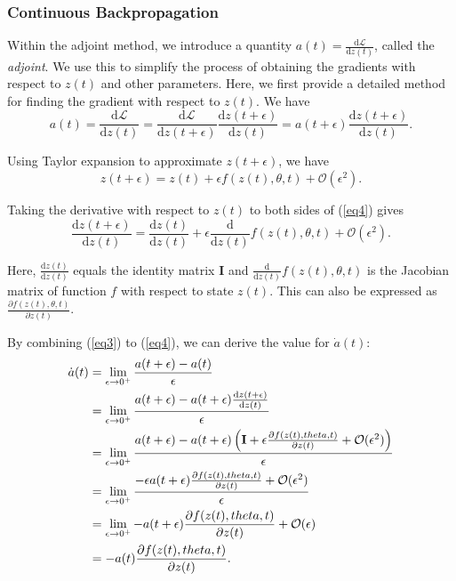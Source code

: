 \documentclass[a4paper,11pt,titlepage]{article}
\theoremstyle{definition}
\theoremstyle{plain}
\theoremstyle{remark}
\begin{document}
\subsubsection{Continuous Backpropagation}
\label{sec:contback}

Within the adjoint method, we introduce a quantity $a(t) = \frac{\mathrm{d} \mathcal{L}}{\mathrm{d} z(t)}$, called the \textit{adjoint}. We use this to simplify the process of obtaining the gradients with respect to $z(t)$ and other parameters. Here, we first provide a detailed method for finding the gradient with respect to $z(t)$. We have
\begin{equation}\label{eq3}
    a(t) = \frac{\mathrm{d} \mathcal{L}}{\mathrm{d} z(t)} = \frac{\mathrm{d} \mathcal{L}}{\mathrm{d} z(t+\epsilon)}\frac{\mathrm{d} z(t+\epsilon)}{\mathrm{d} z(t)}=a(t+\epsilon)\frac{\mathrm{d} z(t+\epsilon)}{\mathrm{d} z(t)}. \tag{3}
\end{equation}

Using Taylor expansion to approximate $z(t+\epsilon)$, we have
\begin{equation}\label{eq4}
z(t+\epsilon) = z(t)+\epsilon f(z(t),\theta,t) +\mathcal{O}(\epsilon^2). \tag{4}
\end{equation}

Taking the derivative with respect to $z(t)$ to both sides of (\ref{eq4}) gives
$$
\frac{\mathrm{d}z(t+\epsilon)}{\mathrm{d}z(t)} = \frac{\mathrm{d}z(t)}{\mathrm{d}z(t)}+\epsilon\frac{\mathrm{d}}{\mathrm{d}z(t)}f(z(t),\theta,t)+\mathcal{O}(\epsilon^2).
$$

Here, $\frac{\mathrm{d}z(t)}{\mathrm{d}z(t)}$ equals the identity matrix $\mathbf{I}$ and $\frac{\mathrm{d}}{\mathrm{d}z(t)}f(z(t),\theta,t)$ is the Jacobian matrix of function $f$ with respect to state $z(t)$. This can also be expressed as $\frac{\partial f(z(t),\theta,t)}{\partial z(t)}$.

By combining (\ref{eq3}) to (\ref{eq4}), we can derive the value for $\dot{a}(t)$:
\begin{align}
\dot{a}(t) &= \lim_{\epsilon \to 0^{+}}\frac{a(t+\epsilon)-a(t)}{\epsilon}\notag\\
&=\lim_{\epsilon \to 0^{+}}\frac{a(t+\epsilon)-a(t+\epsilon)\frac{\mathrm{d} z(t+\epsilon)}{\mathrm{d}z(t)}}{\epsilon}\notag\\
&=\lim_{\epsilon \to 0^{+}}\frac{a(t+\epsilon)-a(t+\epsilon)\left(\mathbf{I}+\epsilon\frac{\partial f(z(t),\theta,t)}{\partial z(t)}+\mathcal{O}(\epsilon^2)\right)}{\epsilon}\notag\\
&=\lim_{\epsilon \to 0^{+}}\frac{-\epsilon a(t+\epsilon)\frac{\partial f(z(t),\theta,t)}{\partial z(t)}+\mathcal{O}(\epsilon^2)}{\epsilon}\notag
\\
&=\lim_{\epsilon \to 0^{+}}-a(t+\epsilon)\frac{\partial f(z(t),\theta,t)}{\partial z(t)}+\mathcal{O}(\epsilon)\notag\\
&=-a(t)\frac{\partial f(z(t),\theta,t)}{\partial z(t)}.\notag
\end{align}
\end{document}
